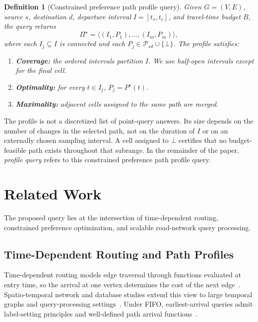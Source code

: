 \documentclass[a4paper,fleqn]{cas-dc}
\newtheorem{definition}{Definition}
\begin{document}
\begin{definition}[Constrained preference path profile query]
Given \(G=(V,E)\), source \(s\), destination \(d\), departure interval \(I=[t_s,t_e]\), and travel-time budget \(B\), the query returns
\[
\Pi^\star
=
\langle
(I_1,P_1),\ldots,(I_m,P_m)
\rangle,
\]
where each \(I_j\subseteq I\) is connected and each \(P_j\in\mathcal P_{sd}\cup\{\bot\}\). The profile satisfies:
\begin{enumerate}
    \item \textbf{Coverage:} the ordered intervals partition \(I\). We use half-open intervals except for the final cell.
    \item \textbf{Optimality:} for every \(t\in I_j\), \(P_j=P^\star(t)\).
    \item \textbf{Maximality:} adjacent cells assigned to the same path are merged.
\end{enumerate}
\end{definition}

The profile is not a discretized list of point-query answers. Its size depends on the number of changes in the selected path, not on the duration of \(I\) or on an externally chosen sampling interval. A cell assigned to \(\bot\) certifies that no budget-feasible path exists throughout that subrange. In the remainder of the paper, \emph{profile query} refers to this constrained preference path profile query.

\section{Related Work}
\label{sec:related_work}

The proposed query lies at the intersection of time-dependent routing, constrained preference optimization, and scalable road-network query processing.

\subsection{Time-Dependent Routing and Path Profiles}
\label{subsec:rw_td_profiles}

Time-dependent routing models edge traversal through functions evaluated at entry time, so the arrival at one vertex determines the cost of the next edge~\cite{td-djk,OrdaRom1990TDSP}. Spatio-temporal network and database studies extend this view to large temporal graphs and query-processing settings~\cite{GeorgeS06,GeorgeKS07,tdsp-index1}. Under FIFO, earliest-arrival queries admit label-setting principles and well-defined path arrival functions~\cite{DehneOmranSack2012}.
\end{document}
